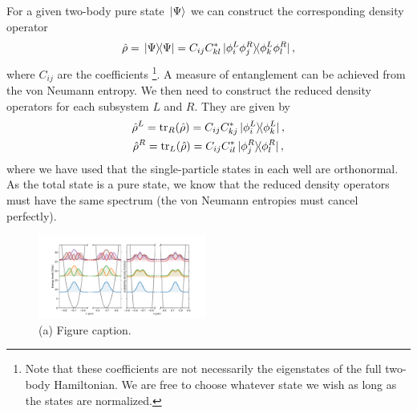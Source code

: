 \documentclass[twocolumn,superscriptaddress,unsortedaddress,
 amsmath,amssymb,
 aps,
]{revtex4-2}
\begin{document}
        For a given two-body pure state $\ket*{\Psi}$ we can construct the
        corresponding density operator
        \begin{align*}
            \hat{\rho} = \dyad*{\Psi}{\Psi}
            = C_{ij} C^{*}_{kl} \dyad*{\phi^L_i \phi^R_j}{
                \phi^L_k \phi^R_l
            },
        \end{align*}
        where $C_{ij}$ are the coefficients \footnote{
            Note that these coefficients are not necessarily the eigenstates
            of the full two-body Hamiltonian.
            We are free to choose whatever state we wish as long as the states
            are normalized.
        }.
        A measure of entanglement can be achieved from the von Neumann entropy.
        We then need to construct the reduced density operators for each
        subsystem $L$ and $R$.
        They are given by
        \begin{gather*}
            \hat{\rho}^L
            = \tr_R \! \qty(\hat{\rho})
            = C_{ij} C^{*}_{kj} \dyad*{\phi^L_i}{\phi^L_k},
            \\
            \hat{\rho}^R
            = \tr_{L} \! \qty(\hat{\rho})
            = C_{ij} C^{*}_{il} \dyad*{\phi^R_j}{\phi^R_l},
        \end{gather*}
        where we have used that the single-particle states in each well are
        orthonormal.
        As the total state is a pure state, we know that the reduced density
        operators must have the same spectrum (the von Neumann entropies must
        cancel perfectly).

 

        
\begin{figure}
\includegraphics[width=0.49\textwidth]{figure2.pdf}
\caption{\label{fig2} (a) Figure caption.}
\end{figure}
\end{document}
